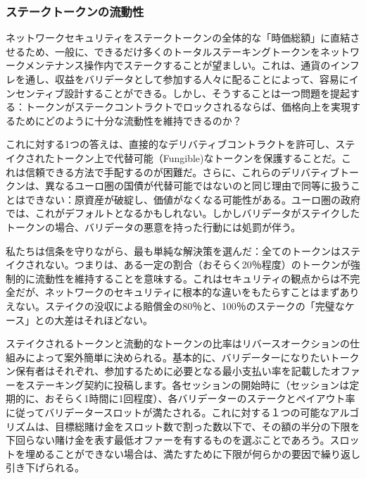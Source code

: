 \hypertarget{ux30b9ux30c6ux30fcux30afux30c8ux30fcux30afux30f3ux306eux6d41ux52d5ux6027}{%
\subsubsection{ステークトークンの流動性}\label{ux30b9ux30c6ux30fcux30afux30c8ux30fcux30afux30f3ux306eux6d41ux52d5ux6027}}

ネットワークセキュリティをステークトークンの全体的な「時価総額」に直結させるため、一般に、できるだけ多くのトータルステーキングトークンをネットワークメンテナンス操作内でステークすることが望ましい。これは、通貨のインフレを通し、収益をバリデータとして参加する人々に配ることによって、容易にインセンティブ設計することができる。しかし、そうすることは一つ問題を提起する：トークンがステークコントラクトでロックされるならば、価格向上を実現するためにどのように十分な流動性を維持できるのか？

これに対する1つの答えは、直接的なデリバティブコントラクトを許可し、ステイクされたトークン上で代替可能（Fungible)なトークンを保護することだ。これは信頼できる方法で手配するのが困難だ。さらに、これらのデリバティブトークンは、異なるユーロ圏の国債が代替可能ではないのと同じ理由で同等に扱うことはできない：原資産が破綻し、価値がなくなる可能性がある。ユーロ圏の政府では、これがデフォルトとなるかもしれない。しかしバリデータがステイクしたトークンの場合、バリデータの悪意を持った行動には処罰が伴う。

私たちは信条を守りながら、最も単純な解決策を選んだ：全てのトークンはステイクされない。つまりは、ある一定の割合（おそらく20％程度）のトークンが強制的に流動性を維持することを意味する。これはセキュリティの観点からは不完全だが、ネットワークのセキュリティに根本的な違いをもたらすことはまずありえない。ステイクの没収による賠償金の80％と、100％のステークの「完璧なケース」との大差はそれほどない。

ステイクされるトークンと流動的なトークンの比率はリバースオークションの仕組みによって案外簡単に決められる。基本的に、バリデーターになりたいトークン保有者はそれぞれ、参加するために必要となる最小支払い率を記載したオファーをステーキング契約に投稿します。各セッションの開始時に（セッションは定期的に、おそらく1時間に1回程度）、各バリデーターのステークとペイアウト率に従ってバリデータースロットが満たされる。これに対する１つの可能なアルゴリズムは、目標総賭け金をスロット数で割った数以下で、その額の半分の下限を下回らない賭け金を表す最低オファーを有するものを選ぶことであろう。スロットを埋めることができない場合は、満たすために下限が何らかの要因で繰り返し引き下げられる。


